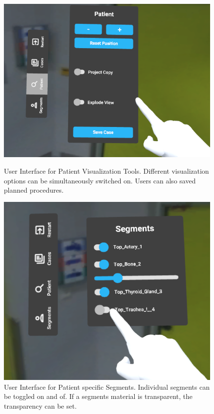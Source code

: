 \begin{figure}[ht]
    \centering
    \begin{minipage}{.5\textwidth}
      \centering
      \includegraphics[width=0.95\linewidth]{images/implementation/user_interface/patient.png}
      \caption{\label{fig::UIPatient}User Interface for Patient Visualization Tools. Different visualization options can be simultaneously switched on.
      Users can also saved planned procedures.}
    \end{minipage}%
    \begin{minipage}{.5\textwidth}
      \centering
      \includegraphics[width=0.95\linewidth]{images/implementation/user_interface/segments.png}
      \caption{\label{fig::UIPatientSegments}User Interface for Patient specific Segments. Individual segments can be toggled on and of. If a segments material is transparent, the transparency can be set.}
    \end{minipage}
  \end{figure}